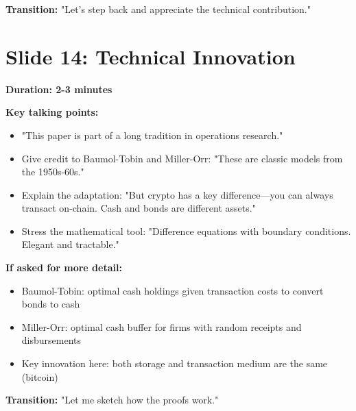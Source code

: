 \documentclass[11pt]{article}
\begin{document}
\textbf{Transition:} "Let's step back and appreciate the technical contribution."

\section*{Slide 14: Technical Innovation}

\textbf{Duration: 2-3 minutes}

\textbf{Key talking points:}
\begin{itemize}
    \item "This paper is part of a long tradition in operations research."
    \item Give credit to Baumol-Tobin and Miller-Orr: "These are classic models from the 1950s-60s."
    \item Explain the adaptation: "But crypto has a key difference—you can always transact on-chain. Cash and bonds are different assets."
    \item Stress the mathematical tool: "Difference equations with boundary conditions. Elegant and tractable."
\end{itemize}

\textbf{If asked for more detail:}
\begin{itemize}
    \item Baumol-Tobin: optimal cash holdings given transaction costs to convert bonds to cash
    \item Miller-Orr: optimal cash buffer for firms with random receipts and disbursements
    \item Key innovation here: both storage and transaction medium are the same (bitcoin)
\end{itemize}

\textbf{Transition:} "Let me sketch how the proofs work."



\end{document}
